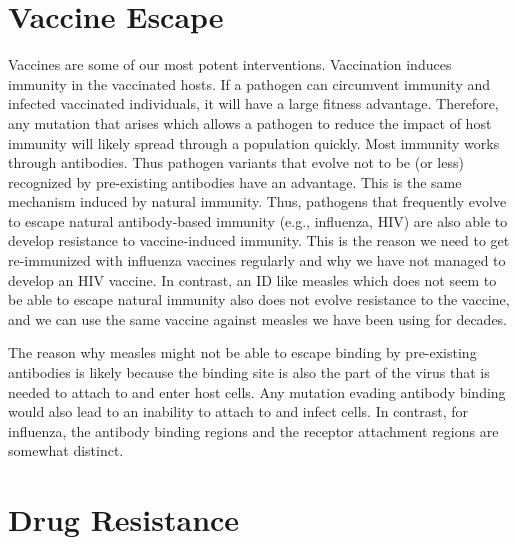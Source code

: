 \documentclass[
]{book}
\begin{document}
\hypertarget{vaccine-escape}{%
\section{Vaccine Escape}\label{vaccine-escape}}

Vaccines are some of our most potent interventions. Vaccination induces immunity in the vaccinated hosts. If a pathogen can circumvent immunity and infected vaccinated individuals, it will have a large fitness advantage. Therefore, any mutation that arises which allows a pathogen to reduce the impact of host immunity will likely spread through a population quickly. Most immunity works through antibodies. Thus pathogen variants that evolve not to be (or less) recognized by pre-existing antibodies have an advantage. This is the same mechanism induced by natural immunity. Thus, pathogens that frequently evolve to escape natural antibody-based immunity (e.g., influenza, HIV) are also able to develop resistance to vaccine-induced immunity. This is the reason we need to get re-immunized with influenza vaccines regularly and why we have not managed to develop an HIV vaccine. In contrast, an ID like measles which does not seem to be able to escape natural immunity also does not evolve resistance to the vaccine, and we can use the same vaccine against measles we have been using for decades.

The reason why measles might not be able to escape binding by pre-existing antibodies is likely because the binding site is also the part of the virus that is needed to attach to and enter host cells. Any mutation evading antibody binding would also lead to an inability to attach to and infect cells. In contrast, for influenza, the antibody binding regions and the receptor attachment regions are somewhat distinct.

\hypertarget{drug-resistance}{%
\section{Drug Resistance}\label{drug-resistance}}
\end{document}
